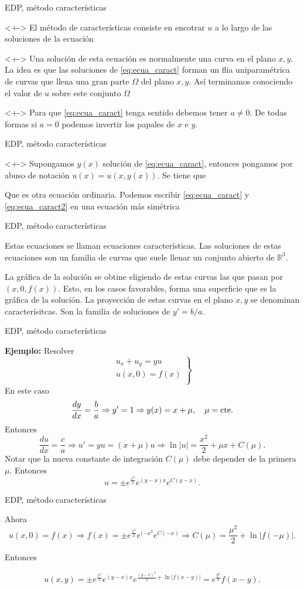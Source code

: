 \documentclass{article}
\renewcommand{\emph}[1]{\textcolor[rgb]{1,0,0}{#1}}
\begin{document}
 



{EDP, método características}

<+-> El método de características consiste en encotrar $u$ a lo largo de las soluciones de la ecuación


<+-> Una solución de esta ecuación es normalmente una curva en el plano  $x,y$. La idea es que las soluciones de \eqref{eq:ecua_caract} forman un flia uniparamétrica
 de curvas que llena una gran parte $\Omega$ del plano $x,y$.  Así terminamos conociendo el valor de $u$ sobre este conjunto $\Omega$ 

<+-> Para que \eqref{eq:ecua_caract} tenga sentido debemos tener $a\neq 0$. De todas formas si $a=0$ podemos invertir los papales de $x$ e $y$.


{EDP, método características}


<+-> Supongamos $y(x)$ solución de \eqref{eq:ecua_caract}, entonces pongamos por abuso de notación $u(x)=u(x,y(x))$. Se tiene que

Que es otra ecuación ordinaria. Podemos escribir  \eqref{eq:ecua_caract} y \eqref{eq:ecua_caract2} en una ecuación más simétrica


 
 

{EDP, método características}


Estas ecuaciones se llaman \emph{ecuaciones características}. Las soluciones de estas ecuaciones son un familia de curvas que suele llenar un conjunto abierto de  $\mathbb{R}^3$. 

 La gráfica de la solución se obtine eligiendo de estas curvas las que pasan por $(x,0,f(x))$. Esto, en los casos favorables, forma una superficie que es la gráfica de la solución. La proyección de estas curvas en el plano $x,y$ se denominan \emph{caracterísitcas}. Son la familia de soluciones de $y'=b/a$.



{EDP, método características}

\textbf{Ejemplo:} Resolver
\begin{equation}\label{eq:EDP_gral_1orden}
  \left.\begin{array}{l}
  u_x+u_y=yu\\
  u(x,0)=f(x)\\
\end{array}\right\}
\end{equation}
En este caso
\[\frac{dy}{dx}=\frac{b}{a}\Rightarrow y'=1\Rightarrow y(x)=x+\mu,\quad\mu=\hbox{cte}.\]
Entonces
\[\frac{du}{dx}=\frac{c}{a}\Rightarrow u'=yu=(x+\mu)u\Rightarrow \ln|u|=\frac{x^2}{2}+\mu x+C(\mu).\]
Notar que la nueva constante de integración $C(\mu)$ debe depender de la primera $\mu$. Entonces
\[u=\pm e^{\frac{x^2}{2}}e^{(y-x)x}e^{C(y-x)}.\]



{EDP, método características}

Ahora
\[u(x,0)=f(x)\Rightarrow f(x)=\pm e^{\frac{x^2}{2}}e^{(-x^2}e^{C(-x)}\Rightarrow C(\mu)=\frac{\mu^2}{2}+\ln|f(-\mu)|.\]

Entonces

\[u(x,y)=\pm e^{\frac{x^2}{2}}e^{(y-x)x}e^{\frac{(y-x)^2}{2}+\ln|f(x-y)|        }
=e^{\frac{y^2}{2}}f(x-y).\]
\end{document}
